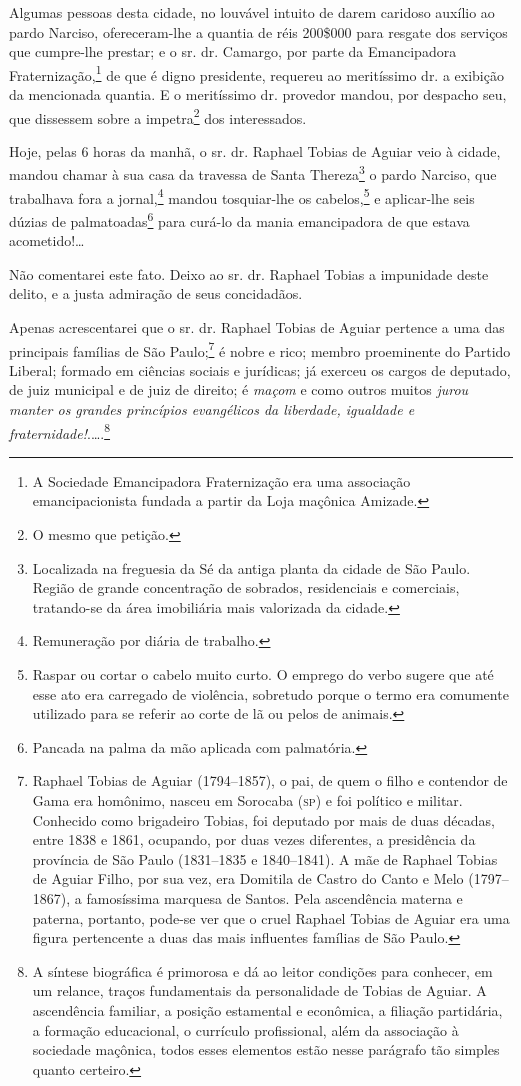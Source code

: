 Algumas pessoas desta cidade, no louvável intuito de darem caridoso
auxílio ao pardo Narciso, ofereceram-lhe a quantia de réis 200\$000 para
resgate dos serviços que cumpre-lhe prestar; e o sr. dr. Camargo, por
parte da Emancipadora Fraternização,\footnote{A
  Sociedade Emancipadora Fraternização era uma associação
  emancipacionista fundada a partir da Loja maçônica Amizade.} de que é
digno presidente, requereu ao meritíssimo dr. a exibição da mencionada
quantia. E o meritíssimo dr. provedor mandou, por despacho seu, que
dissessem sobre a impetra\footnote{ O mesmo que petição.} dos
interessados.

Hoje, pelas 6 horas da manhã, o sr. dr. Raphael Tobias de Aguiar veio à
cidade, mandou chamar à sua casa da travessa de Santa Thereza\footnote{
  Localizada na freguesia da Sé da antiga planta da cidade de São Paulo.
  Região de grande concentração de sobrados, residenciais e comerciais,
  tratando-se da área imobiliária mais valorizada da cidade.} o pardo
Narciso, que trabalhava fora a jornal,\footnote{
  Remuneração por diária de trabalho.} mandou tosquiar-lhe os
cabelos,\footnote{ Raspar ou cortar o cabelo muito curto. O emprego
  do verbo sugere que até esse ato era carregado de violência, sobretudo
  porque o termo era comumente utilizado para se referir ao corte de lã
  ou pelos de animais.} e aplicar-lhe seis dúzias de
palmatoadas\footnote{ Pancada na palma da mão aplicada com
  palmatória.} para curá-lo da mania emancipadora de que estava
acometido!\ldots{}

Não comentarei este fato. Deixo ao sr. dr. Raphael Tobias a impunidade
deste delito, e a justa admiração de seus concidadãos.

Apenas acrescentarei que o sr. dr. Raphael Tobias de Aguiar pertence a
uma das principais famílias de São Paulo;\footnote{ Raphael Tobias de
  Aguiar (1794--1857), o pai, de quem o filho e contendor de Gama era
  homônimo, nasceu em Sorocaba (\textsc{sp}) e foi político e militar. Conhecido
  como brigadeiro Tobias, foi deputado por mais de duas décadas, entre
  1838 e 1861, ocupando, por duas vezes diferentes, a presidência da
  província de São Paulo (1831--1835 e 1840--1841). A mãe de Raphael
  Tobias de Aguiar Filho, por sua vez, era Domitila de Castro do Canto e
  Melo (1797--1867), a famosíssima marquesa de Santos. Pela ascendência
  materna e paterna, portanto, pode-se ver que o cruel Raphael Tobias de
  Aguiar era uma figura pertencente a duas das mais influentes famílias
  de São Paulo.} é nobre e rico; membro proeminente do Partido Liberal;
formado em ciências sociais e jurídicas; já exerceu os cargos de
deputado, de juiz municipal e de juiz de direito; é \emph{maçom} e como
outros muitos \emph{jurou manter os grandes princípios evangélicos da
liberdade, igualdade e fraternidade!}.\ldots.\footnote{ A síntese
  biográfica é primorosa e dá ao leitor condições para conhecer, em um
  relance, traços fundamentais da personalidade de Tobias de Aguiar. A
  ascendência familiar, a posição estamental e econômica, a filiação
  partidária, a formação educacional, o currículo profissional, além da
  associação à sociedade maçônica, todos esses elementos estão nesse
  parágrafo tão simples quanto certeiro.}

